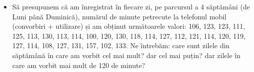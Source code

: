 \documentclass[]{article}
\newenvironment{Shaded}{\begin{snugshade}}{\end{snugshade}}
\newcommand{\DataTypeTok}[1]{\textcolor[rgb]{0.13,0.29,0.53}{#1}}
\newcommand{\DecValTok}[1]{\textcolor[rgb]{0.00,0.00,0.81}{#1}}
\newcommand{\FloatTok}[1]{\textcolor[rgb]{0.00,0.00,0.81}{#1}}
\newcommand{\KeywordTok}[1]{\textcolor[rgb]{0.13,0.29,0.53}{\textbf{#1}}}
\newcommand{\NormalTok}[1]{#1}
\newcommand{\OperatorTok}[1]{\textcolor[rgb]{0.81,0.36,0.00}{\textbf{#1}}}
\newcommand{\OtherTok}[1]{\textcolor[rgb]{0.56,0.35,0.01}{#1}}
\newcommand{\StringTok}[1]{\textcolor[rgb]{0.31,0.60,0.02}{#1}}
\newenvironment{frshaded*}{%
  \def\FrameCommand{\fboxrule=\FrameRule\fboxsep=\FrameSep \fcolorbox{framecolor}{shadecolor1}}%
  \MakeFramed {\advance\hsize-\width \FrameRestore}}%
{\endMakeFramed}
\newenvironment{rmdblock}[1]
  {\begin{frshaded*}
  \begin{itemize}
  \renewcommand{\labelitemi}{
    \raisebox{-.7\height}[0pt][0pt]{
      {\setkeys{Gin}{width=2em,keepaspectratio}\texttt{[image: images/icons/\#1]}}
    }
  }
  \item
  }
  {
  \end{itemize}
  \end{frshaded*}
  }
\newenvironment{rmdexercise}
  {\begin{rmdblock}{exercise}}
  {\end{rmdblock}}
\begin{document}
\begin{Shaded}
\end{Shaded}

\begin{rmdexercise}
Să presupunem că am înregistrat în fiecare zi, pe parcursul a 4
săptămâni (de Luni până Duminică), numărul de minute petrecute la
telefonul mobil (convorbiri + utilizare) și am obținut următoarele
valori: 106, 123, 123, 111, 125, 113, 130, 113, 114, 100, 120, 130, 118,
114, 127, 112, 121, 114, 120, 119, 127, 114, 108, 127, 131, 157, 102,
133. Ne întrebăm: care sunt zilele din săptămână în care am vorbit cel
mai mult? dar cel mai puțin? dar zilele în care am vorbit mai mult de
120 de minute?
\end{rmdexercise}
\end{document}
